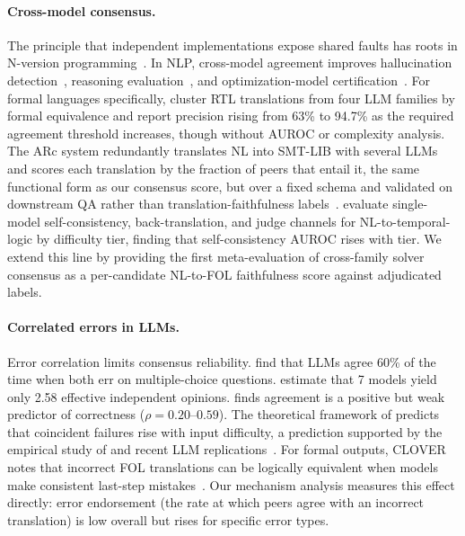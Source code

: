 \documentclass[11pt,letterpaper]{article}
\begin{document}
\paragraph{Cross-model consensus.}
The principle that independent implementations expose shared faults has roots in N-version programming~\citep{Eckhardt1985, Knight1986, Kuncheva2003, Ron2026}. In NLP, cross-model agreement improves hallucination detection~\citep{Farquhar2024}, reasoning evaluation~\citep{Liu2026}, and optimization-model certification~\citep{Lian2026}. For formal languages specifically, \citet{Alvanaki2026} cluster RTL translations from four LLM families by formal equivalence and report precision rising from 63\% to 94.7\% as the required agreement threshold increases, though without AUROC or complexity analysis. The ARc system redundantly translates NL into SMT-LIB with several LLMs and scores each translation by the fraction of peers that entail it, the same functional form as our consensus score, but over a fixed schema and validated on downstream QA rather than translation-faithfulness labels~\citep{Bayless2025}. \citet{Wang2026} evaluate single-model self-consistency, back-translation, and judge channels for NL-to-temporal-logic by difficulty tier, finding that self-consistency AUROC rises with tier. We extend this line by providing the first meta-evaluation of cross-family solver consensus as a per-candidate NL-to-FOL faithfulness score against adjudicated labels.

\paragraph{Correlated errors in LLMs.}
Error correlation limits consensus reliability. \citet{Kim2025} find that LLMs agree 60\% of the time when both err on multiple-choice questions. \citet{Nee2026} estimate that 7 models yield only 2.58 effective independent opinions. \citet{Ding2026} finds agreement is a positive but weak predictor of correctness ($\rho = 0.20$--$0.59$). The theoretical framework of \citet{Eckhardt1985} predicts that coincident failures rise with input difficulty, a prediction supported by the empirical study of \citet{Knight1986} and recent LLM replications~\citep{Hagele2026, Khanbayov2026}. For formal outputs, CLOVER notes that incorrect FOL translations can be logically equivalent when models make consistent last-step mistakes~\citep{Ryu2024}. Our mechanism analysis measures this effect directly: error endorsement (the rate at which peers agree with an incorrect translation) is low overall but rises for specific error types.
\end{document}
